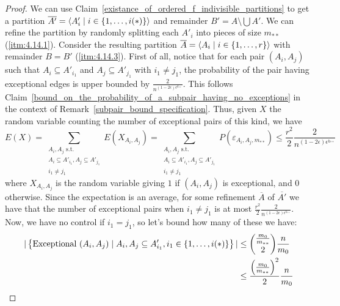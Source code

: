         \begin{proof}
            We can use Claim~\ref{existance_of_ordered_f_indivisible_partitions} to get a partition
            $\overline{A'} = \left< A'_i \mid i \in \left\{ 1, \dots, i(*) \right\} \right>$ and remainder $B' = A \setminus \bigcup A'$.
            We can refine the partition by randomly splitting each $A'_i$ into pieces of size $m_{**}$ (\ref{itm:4.14.1}).
            Consider the resulting partition $\overline{A} = \left< A_i \mid i \in \left\{ 1, \dots, r \right\} \right>$ with remainder $B = B'$
            (\ref{itm:4.14.3}).
            First of all, notice that for each pair $(A_i, A_j)$ such that $A_i \subseteq A'_{i_1}$ and
            $A_j \subseteq A'_{j_1}$ with $i_1 \neq j_1$, the probability of the pair having exceptional edges is
            upper bounded by $\frac{2}{n^{(1-2\epsilon)\epsilon^{k_{**}}}}$.
            This follows Claim~\ref{bound_on_the_probability_of_a_subpair_having_no_exceptions} in the context of
            Remark~\ref{subpair_bound_specification}.
            Thus, given $X$ the random variable counting the number of exceptional pairs of this kind, we have
            \[
                E(X) = \sum_{\substack{A_i,A_j \text{ s.t.}\\A_i\subseteq A'_{i_1},A_j\subseteq A'_{j_1}\\i_1\neq j_1}} E(X_{A_i, A_j})
                     = \sum_{\substack{A_i,A_j \text{ s.t.}\\A_i\subseteq A'_{i_1},A_j\subseteq A'_{j_1}\\i_1\neq j_1}} P(\varepsilon_{A_i, A_j,m_{**}})
                     \leq \frac{r^2}{2} \frac{2}{n^{(1-2\epsilon)\epsilon^{k_{**}}}}
            \]
            where $X_{A_i,A_j}$ is the random variable giving $1$ if $(A_i, A_j)$ is exceptional, and $0$ otherwise.
            Since the expectation is an average, for some refinement $\overline{A}$ of $\overline{A'}$ we have that
            the number of exceptional pairs when $i_1 \neq j_1$ is at most $\frac{r^2}{2} \frac{2}{n^{(1-2\epsilon)\epsilon^{k_{**}}}}$.
            Now, we have no control if $i_1 = j_1$, so let's bound how many of these we have:
            \[
                \begin{split}
                    |\left\{ \text{Exceptional } (A_i, A_j) \mid A_i, A_j \subseteq A'_{i_1}, i_1 \in \parcurly{1, \dots, i(*)} \right\}|
                        & \leq {\frac{m_0}{m_{**}} \choose 2} \frac{n}{m_0} \\
                        & \leq \frac{\parround{\frac{m_0}{m_{**}}}^2}{2} \frac{n}{m_0}

\end{split}\]
\end{proof}
